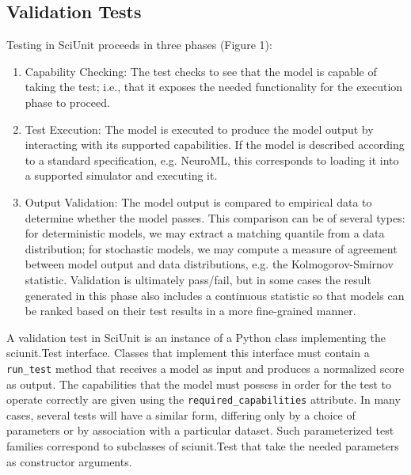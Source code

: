 \documentclass[11pt,letterpaper]{article}
\begin{document}
\subsection{Validation Tests} 
Testing in SciUnit proceeds in three phases (Figure 1): 
\begin{enumerate}
\item Capability Checking: The test checks to see that the model is capable of taking the test; i.e., that it exposes the needed functionality for the execution phase to proceed.
\item Test Execution: The model is executed to produce the model output by interacting with its supported capabilities.  If the model is described according to a standard specification, e.g. NeuroML, this corresponds to loading it into a supported simulator and executing it. 
\item Output Validation: The model output is compared to empirical data to determine whether the model passes.  This comparison can be of several types: for deterministic models, we may extract a matching quantile from a data distribution; for stochastic models, we may compute a measure of agreement between model output and data distributions, e.g. the Kolmogorov-Smirnov statistic.  Validation is ultimately pass/fail, but in some cases the result generated in this phase also includes a continuous statistic so that models can be ranked based on their test results in a more fine-grained manner.   
\end{enumerate}

A validation test in SciUnit is an instance of a Python class implementing the sciunit.Test interface. Classes that implement this interface must contain a \verb|run_test| method that receives a model as input and produces a normalized score as output. The capabilities that the model must possess in order for the test to operate correctly are given using the \verb|required_capabilities| attribute. In many cases, several tests will have a similar form, differing only by a choice of parameters or by association with a particular dataset. Such parameterized test families correspond to subclasses of sciunit.Test that take the needed parameters as constructor arguments. 
\end{document}
